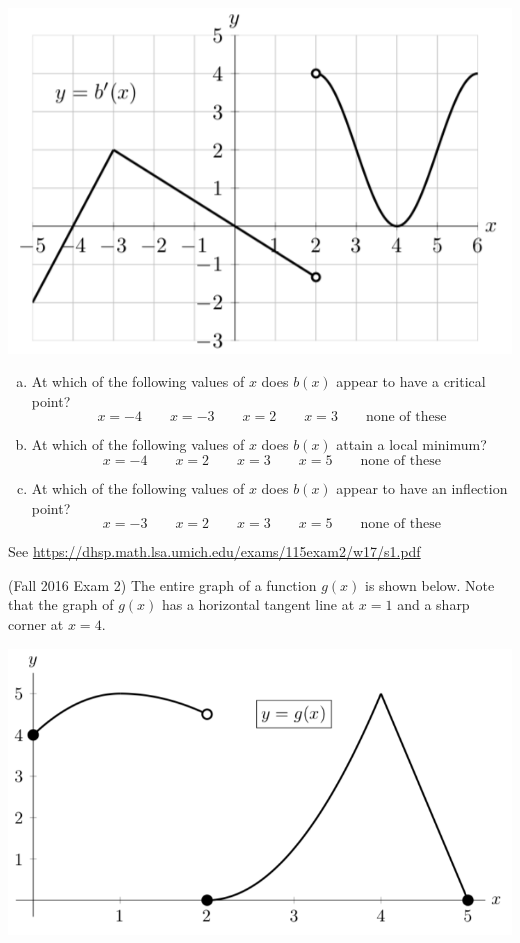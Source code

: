 \documentclass[11pt]{exam}
\begin{document}
\begin{questions}
\begin{center}
          \includegraphics[scale=0.4]{Figures/Winter2017Exam2Problem1}
        \end{center}
\begin{enumerate}[(a)]
	\item At which of the following values of $x$ does $b(x)$ appear to have a critical point?
		$$x=-4 \qquad x=-3 \qquad x=2 \qquad x=3 \qquad \textrm{none of these}$$
	\item At which of the following values of $x$ does $b(x)$ attain a local minimum?
	$$x=-4 \qquad x=2 \qquad x=3 \qquad x=5 \qquad \textrm{none of these}$$
	\item At which of the following values of $x$ does $b(x)$ appear to have an inflection point?
	$$x=-3 \qquad x=2 \qquad x=3 \qquad x=5 \qquad \textrm{none of these}$$
	\end{enumerate}
        \begin{solution}
          See \href{https://dhsp.math.lsa.umich.edu/exams/115exam2/w17/s1.pdf}{https://dhsp.math.lsa.umich.edu/exams/115exam2/w17/s1.pdf}
        \end{solution}
\question (Fall 2016 Exam 2) %
	The entire graph of a function $g(x)$ is shown below. Note that the graph of $g(x)$ has a horizontal tangent line at $x = 1$ and a sharp corner at $x = 4$.
        \begin{center}
          \includegraphics[scale=0.5]{Figures/Fall2016Exam2Problem6}

\end{center}
\end{questions}
\end{document}
